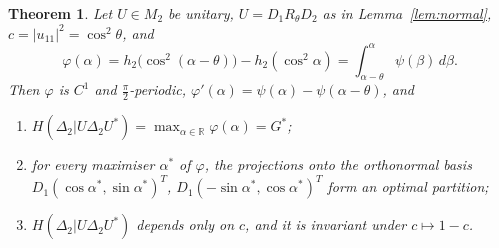 \documentclass[11pt]{article}
\newcommand{\R}{\mathbb{R}}
\theoremstyle{plain}
\newtheorem{theorem}{Theorem}[section]
\theoremstyle{definition}
\theoremstyle{remark}
\begin{document}
\begin{theorem}\label{thm:n2}
Let $U\in M_2$ be unitary, $U=D_1R_\theta D_2$ as in Lemma~\ref{lem:normal}, $c=|u_{11}|^2=\cos^2\theta$, and
\[
  \varphi(\alpha)=h_2\bigl(\cos^2(\alpha-\theta)\bigr)-h_2(\cos^2\alpha)=\int_{\alpha-\theta}^{\alpha}\psi(\beta)\,d\beta .
\]
Then $\varphi$ is $C^1$ and $\frac\pi2$-periodic, $\varphi'(\alpha)=\psi(\alpha)-\psi(\alpha-\theta)$, and
\begin{enumerate}
\item[(a)] $H(\Delta_2|U\Delta_2U^*)=\max_{\alpha\in\R}\varphi(\alpha)=G^*$;
\item[(b)] for every maximiser $\alpha^*$ of $\varphi$, the projections onto the orthonormal basis $D_1(\cos\alpha^*,\sin\alpha^*)^T$,
$D_1(-\sin\alpha^*,\cos\alpha^*)^T$ form an optimal partition;
\item[(c)] $H(\Delta_2|U\Delta_2U^*)$ depends only on $c$, and it is invariant under $c\mapsto1-c$.
\end{enumerate}
\end{theorem}
\end{document}

